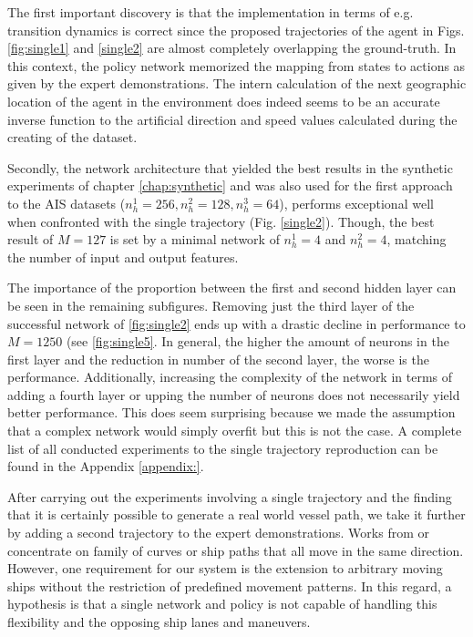 The first important discovery is that the implementation in terms of e.g. transition dynamics is correct since the proposed trajectories of the agent in Figs. \ref{fig:single1} and \ref{single2} are almost completely overlapping the ground-truth. In this context, the policy network memorized the mapping from states to actions as given by the expert demonstrations. The intern calculation of the next geographic location of the agent in the environment does indeed seems to be an accurate inverse function to the artificial direction and speed values calculated during the creating of the dataset.
\par
Secondly, the network architecture that yielded the best results in the synthetic experiments of chapter \ref{chap:synthetic} and was also used for the first approach to the AIS datasets ($n_h^1=256, n_h^2=128, n_h^3=64$), performs exceptional well when confronted with the single trajectory (Fig. \ref{single2}). Though, the best result of $M=127$ is set by a minimal network of $n_h^1=4$ and $n_h^2=4$, matching the number of input and output features.
\par
The importance of the proportion between the first and second hidden layer can be seen in the remaining subfigures. Removing just the third layer of the successful network of \ref{fig:single2} ends up with a drastic decline in performance to $M=1250$ (see \ref{fig:single5}. In general, the higher the amount of neurons in the first layer and the reduction in number of the second layer, the worse is the performance. Additionally, increasing the complexity of the network in terms of adding a fourth layer or upping the number of neurons does not necessarily yield better performance. This does seem surprising because we made the assumption that a complex network would simply overfit but this is not the case. A complete list of all conducted experiments to the single trajectory reproduction can be found in the Appendix \ref{appendix:}.
\par
After carrying out the experiments involving a single trajectory and the finding that it is certainly possible to generate a real world vessel path, we take it further by adding a second trajectory to the expert demonstrations. Works from \cite{edgardo} or \cite{X} concentrate on family of curves or ship paths that all move in the same direction. However, one requirement for our system is the extension to arbitrary moving ships without the restriction of predefined movement patterns. In this regard, a hypothesis is that a single network and policy is not capable of handling this flexibility and the opposing ship lanes and maneuvers.
